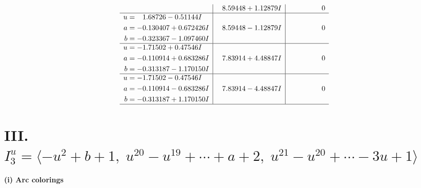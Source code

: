 \documentclass[1p]{elsarticle_modified}
\theoremstyle{definition}
\begin{document}
$$\begin{array}{c|c|c}
 & \phantom{-}8.59448 + 1.12879 I & \phantom{-0.000000 } 0 \\ \hline\begin{aligned}
u &= \phantom{-}1.68726 - 0.51144 I \\
a &= -0.130407 + 0.672426 I \\
b &= -0.323367 - 1.097460 I\end{aligned}
 & \phantom{-}8.59448 - 1.12879 I & \phantom{-0.000000 } 0 \\ \hline\begin{aligned}
u &= -1.71502 + 0.47546 I \\
a &= -0.110914 + 0.683286 I \\
b &= -0.313187 - 1.170150 I\end{aligned}
 & \phantom{-}7.83914 + 4.48847 I & \phantom{-0.000000 } 0 \\ \hline\begin{aligned}
u &= -1.71502 - 0.47546 I \\
a &= -0.110914 - 0.683286 I \\
b &= -0.313187 + 1.170150 I\end{aligned}
 & \phantom{-}7.83914 - 4.48847 I & \phantom{-0.000000 } 0\\
 \hline 
 \end{array}$$\newpage\newpage\renewcommand{\arraystretch}{1}
\centering \section*{III. $I^u_{3}= \langle - u^2+b+1,\;u^{20}- u^{19}+\cdots+a+2,\;u^{21}- u^{20}+\cdots-3 u+1 \rangle$}
\flushleft \textbf{(i) Arc colorings}\\
\end{document}
